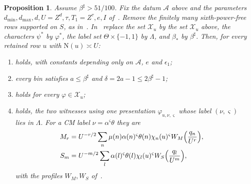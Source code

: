 \documentclass[11pt]{article}
\numberwithin{equation}{section}
\newcommand{\N}{\mathrm N}
\newtheorem{proposition}{Proposition}
\begin{document}
\begin{proposition}\label{prop:s3-detector}
Assume $\beta^\sharp>51/100$. Fix the datum $\mathcal A$ above and the parameters
$d_{\min},d_{\max},d,U=Z^d,\tau,T_1=Z^\tau,e,I$ of~\cite[Section~8.1]{OAI78}. Remove the finitely many
sixth-power-free rows supported on $S$, as in~\cite[Section~8.1]{OAI78}. In~\cite[Section~8]{OAI78}
replace the set $\mathcal X_u$ by the set $\mathcal X_u$ above, the characters $\psi^*$ by $\varphi^*$, the
label set $\Theta\times\{-1,1\}$ by $\Lambda$, and $\beta_*$ by $\beta^\sharp$. Then, for every retained row
$u$ with $\N(u)\asymp U$:
\begin{enumerate}
\item[(i)] \cite[Lemma~8.1]{OAI78} holds, with constants depending only on $\mathcal A$, $e$
 and $\epsilon_1$;
\item[(ii)] every bin satisfies $a\le\beta^\sharp$ and $\delta=2a-1\le2\beta^\sharp-1$;
\item[(iii)] \cite[Lemma~8.2]{OAI78} holds for every $\varphi\in\mathcal X_u$;
\item[(iv)] \cite[Prop.~8.3]{OAI78} holds, the two witnesses using one presentation
 $\varphi_{u,\nu,\varsigma}$ whose label $(\nu,\varsigma)$ lies in $\Lambda$. For a CM label
 $\nu=\alpha^\varsigma\theta$ they are
 \begin{equation}\label{eq:d200}\begin{aligned}
 M_r&=U^{-r/2}\sum_n\mu(n)\alpha(n)^\varsigma\theta(n)\chi_n(u)^\varsigma W_M\Bigl(\frac{q_n}{U^r}\Bigr),\\
 S_m&=U^{-m/2}\sum_l\alpha(l)^\varsigma\theta(l)\chi_l(u)^\varsigma W_S\Bigl(\frac{q_l}{U^m}\Bigr),
 \end{aligned}\end{equation}
 with the profiles $W_M,W_S$ of~\cite[proof of Proposition~8.3]{OAI78}.
\end{enumerate}
\end{proposition}
\end{document}
